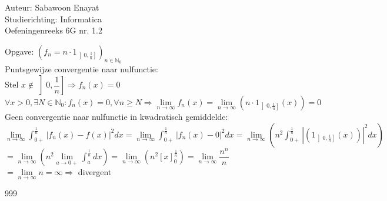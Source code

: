 \documentclass[a4paper]{article}
\begin{document}
  
\noindent \large Auteur: Sabawoon Enayat \\
\noindent \large Studierichting: Informatica\\
\noindent \large Oefeningenreeks 6G nr. 1.2 \\

\medskip

\newcommand{\llim}{\lim\limits}
\newcommand{\dint}{\displaystyle\int}

\normalsize

Opgave: $\left(f_n = n \cdot 1_{\left]0, \tfrac{1}{n}\right]}\right)_{n\in\mathbb{N}_0}$\\

Puntsgewijze convergentie naar nulfunctie:\\

Stel $x \not\in \left]0, \dfrac{1}{n}\right] \Rightarrow f_n(x)  = 0$\\

$\forall x > 0, \exists N\in\mathbb{N}_0: f_n(x) = 0, \forall n \ge N \Rightarrow \llim_{n\to\infty} f_n(x) = \llim_{n\to\infty} \left (n \cdot 1_{\left]0, \tfrac{1}{n}\right]}(x)\right) = 0$\\

Geen convergentie naar nulfunctie in kwadratisch gemiddelde:\\

$\llim_{n\to\infty} \dint_{0+}^{\tfrac{1}{n}} |f_n(x) - f(x)|^2 dx = \llim_{n\to\infty} \dint_{0+}^{\tfrac{1}{n}} |f_n(x) - 0|^2 dx = \llim_{n\to\infty} \left(n^2 \dint_{0+}^{\tfrac{1}{n}} \left|\left(1_{\left]0, \tfrac{1}{n}\right]}(x)\right)\right|^2 dx\right)$\\

$= \llim_{n\to\infty} \left(n^2\llim_{a\to 0+}\dint_{a}^{\tfrac{1}{n}} dx\right) = \llim_{n\to\infty} \left(n^2[x]_{0}^{\tfrac{1}{n}}\right) = \llim_{n\to\infty} \dfrac{n^n}{n}$\\

$= \llim_{n\to\infty} n = \infty \Rightarrow$ divergent\\

\begin{thebibliography}{999}
\end{thebibliography}
\end{document}
